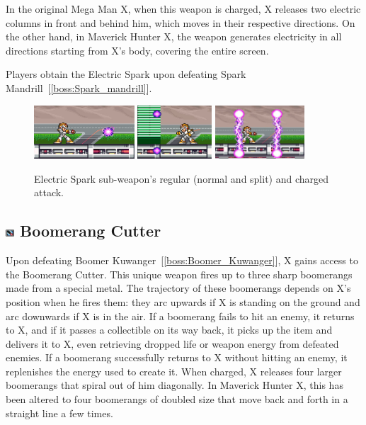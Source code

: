 In the original Mega Man X, when this weapon is charged, X releases two electric columns in front and behind him, which moves in their respective directions. On the other hand, in Maverick Hunter X, the weapon generates electricity in all directions starting from X's body, covering the entire screen. 

Players obtain the Electric Spark upon defeating Spark Mandrill~[\ref{boss:Spark_mandrill}].

\begin{figure}[htp]
	\centering
		\includegraphics[height=2cm]{figures/X1/weapons/Electric_spark_1.jpg}
		\includegraphics[height=2cm]{figures/X1/weapons/Electric_spark_2.jpg}
		\includegraphics[height=2cm]{figures/X1/weapons/Electric_spark_3.jpg}
	\caption{Electric Spark sub-weapon's regular (normal and split) and charged attack.}
\end{figure}

\subsection{\includegraphics[width=12px, height=10px]{figures/X1/weapons/B_cutter.jpg} Boomerang Cutter}\label{Boomerang_cutter}

Upon defeating Boomer Kuwanger~[\ref{boss:Boomer_Kuwanger}], X gains access to the Boomerang Cutter. This unique weapon fires up to three sharp boomerangs~\cite{wiki:Boomerang_cutter} made from a special metal. The trajectory of these boomerangs depends on X's position when he fires them: they arc upwards if X is standing on the ground and arc downwards if X is in the air. If a boomerang fails to hit an enemy, it returns to X, and if it passes a collectible on its way back, it picks up the item and delivers it to X, even retrieving dropped life or weapon energy from defeated enemies. If a boomerang successfully returns to X without hitting an enemy, it replenishes the energy used to create it. When charged, X releases four larger boomerangs that spiral out of him diagonally. In Maverick Hunter X, this has been altered to four boomerangs of doubled size that move back and forth in a straight line a few times.

